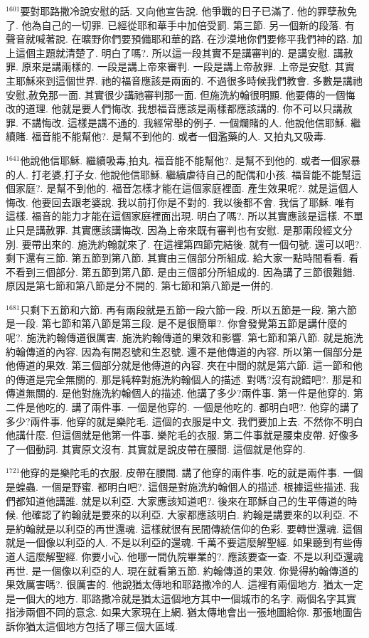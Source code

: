 \documentclass{book}
\begin{document}
$^{1601}$要對耶路撒冷說安慰的話.
又向他宣告說.
他爭戰的日子已滿了.
他的罪孽赦免了.
他為自己的一切罪.
已經從耶和華手中加倍受罰.
第三節.
另一個新的段落.
有聲音就喊著說.
在曠野你們要預備耶和華的路.
在沙漠地你們要修平我們神的路.
加上這個主題就清楚了.
明白了嗎?.
所以這一段其實不是講審判的.
是講安慰.
講赦罪.
原來是講兩樣的.
一段是講上帝來審判.
一段是講上帝赦罪.
上帝是安慰.
其實主耶穌來到這個世界.
祂的福音應該是兩面的.
不過很多時候我們教會.
多數是講祂安慰,赦免那一面.
其實很少講祂審判那一面.
但施洗約翰很明顯.
他要傳的一個悔改的道理.
他就是要人們悔改.
我想福音應該是兩樣都應該講的.
你不可以只講赦罪.
不講悔改.
這樣是講不通的.
我經常舉的例子.
一個爛賭的人.
他說他信耶穌.
繼續賭.
福音能不能幫他?.
是幫不到他的.
或者一個濫藥的人.
又拍丸又吸毒.

$^{1641}$他說他信耶穌.
繼續吸毒,拍丸.
福音能不能幫他?.
是幫不到他的.
或者一個家暴的人.
打老婆,打子女.
他說他信耶穌.
繼續虐待自己的配偶和小孩.
福音能不能幫這個家庭?.
是幫不到他的.
福音怎樣才能在這個家庭裡面.
產生效果呢?.
就是這個人悔改.
他要回去跟老婆說.
我以前打你是不對的.
我以後都不會.
我信了耶穌.
唯有這樣.
福音的能力才能在這個家庭裡面出現.
明白了嗎?.
所以其實應該是這樣.
不單止只是講赦罪.
其實應該講悔改.
因為上帝來既有審判也有安慰.
是那兩段經文分別.
要帶出來的.
施洗約翰就來了.
在這裡第四節完結後.
就有一個句號.
還可以吧?.
剩下還有三節.
第五節到第八節.
其實由三個部分所組成.
給大家一點時間看看.
看不看到三個部分.
第五節到第八節.
是由三個部分所組成的.
因為講了三節很難錯.
原因是第七節和第八節是分不開的.
第七節和第八節是一併的.

$^{1681}$只剩下五節和六節.
再有兩段就是五節一段六節一段.
所以五節是一段.
第六節是一段.
第七節和第八節是第三段.
是不是很簡單?.
你會發覺第五節是講什麼的呢?.
施洗約翰傳道很厲害.
施洗約翰傳道的果效和影響.
第七節和第八節.
就是施洗約翰傳道的內容.
因為有開忍號和生忍號.
還不是他傳道的內容.
所以第一個部分是他傳道的果效.
第三個部分就是他傳道的內容.
夾在中間的就是第六節.
這一節和他的傳道是完全無關的.
那是純粹對施洗約翰個人的描述.
對嗎?沒有說錯吧?.
那是和傳道無關的.
是他對施洗約翰個人的描述.
他講了多少?兩件事.
第一件是他穿的.
第二件是他吃的.
講了兩件事.
一個是他穿的.
一個是他吃的.
都明白吧?.
他穿的講了多少?兩件事.
他穿的就是樂陀毛.
這個的衣服是中文.
我們要加上去.
不然你不明白他講什麼.
但這個就是他第一件事.
樂陀毛的衣服.
第二件事就是腰束皮帶.
好像多了一個動詞.
其實原文沒有.
其實就是說皮帶在腰間.
這個就是他穿的.

$^{1721}$他穿的是樂陀毛的衣服.
皮帶在腰間.
講了他穿的兩件事.
吃的就是兩件事.
一個是蝗蟲.
一個是野蜜.
都明白吧?.
這個是對施洗約翰個人的描述.
根據這些描述.
我們都知道他講誰.
就是以利亞.
大家應該知道吧?.
後來在耶穌自己的生平傳道的時候.
他確認了約翰就是要來的以利亞.
大家都應該明白.
約翰是講要來的以利亞.
不是約翰就是以利亞的再世還魂.
這樣就很有民間傳統信仰的色彩.
要轉世還魂.
這個就是一個像以利亞的人.
不是以利亞的還魂.
千萬不要這麼解聖經.
如果聽到有些傳道人這麼解聖經.
你要小心.
他哪一間仇院畢業的?.
應該要查一查.
不是以利亞還魂再世.
是一個像以利亞的人.
現在就看第五節.
約翰傳道的果效.
你覺得約翰傳道的果效厲害嗎?.
很厲害的.
他說猶太傳地和耶路撒冷的人.
這裡有兩個地方.
猶太一定是一個大的地方.
耶路撒冷就是猶太這個地方其中一個城市的名字.
兩個名字其實指涉兩個不同的意念.
如果大家現在上網.
猶太傳地會出一張地圖給你.
那張地圖告訴你猶太這個地方包括了哪三個大區域.
\end{document}
